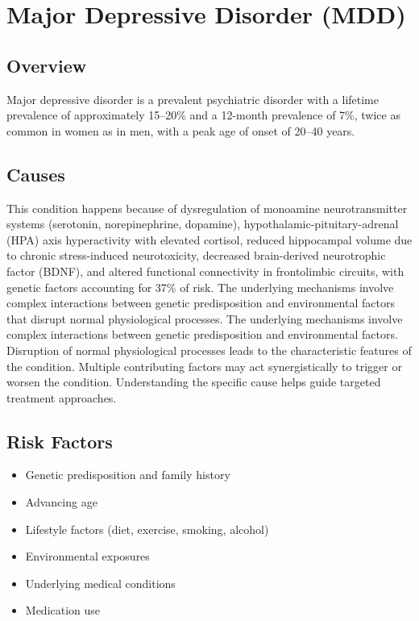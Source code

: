 \chapter{Major Depressive Disorder (MDD)}
\label{sec:Major Depressive Disorder (MDD)}

\section{Overview}
Major depressive disorder is a prevalent psychiatric disorder with a lifetime prevalence of approximately 15--20\% and a 12-month prevalence of 7\%, twice as common in women as in men, with a peak age of onset of 20--40 years.
\section{Causes}
This condition happens because of dysregulation of monoamine neurotransmitter systems (serotonin, norepinephrine, dopamine), hypothalamic-pituitary-adrenal (HPA) axis hyperactivity with elevated cortisol, reduced hippocampal volume due to chronic stress-induced neurotoxicity, decreased brain-derived neurotrophic factor (BDNF), and altered functional connectivity in frontolimbic circuits, with genetic factors accounting for 37\% of risk. The underlying mechanisms involve complex interactions between genetic predisposition and environmental factors that disrupt normal physiological processes. The underlying mechanisms involve complex interactions between genetic predisposition and environmental factors. Disruption of normal physiological processes leads to the characteristic features of the condition. Multiple contributing factors may act synergistically to trigger or worsen the condition. Understanding the specific cause helps guide targeted treatment approaches.
\section{Risk Factors}


\begin{itemize}[noitemsep]
  \item Genetic predisposition and family history
  \item Advancing age
  \item Lifestyle factors (diet, exercise, smoking, alcohol)
  \item Environmental exposures
  \item Underlying medical conditions
  \item Medication use
\end{itemize}
